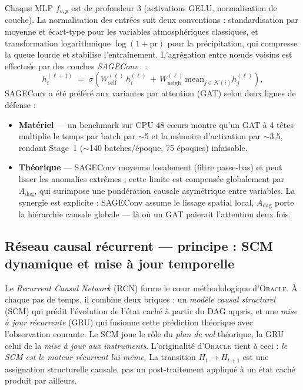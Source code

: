 \documentclass[14pt,a4paper,openany]{extreport}
\theoremstyle{definition}
\newcommand{\Oracle}{\textsc{Oracle}}
\newcommand{\Adag}{\ensuremath{A_{\mathrm{dag}}}}
\newcommand{\Ht}{\ensuremath{H_t}}
\begin{document}
Chaque MLP $f_{v,p}$ est de profondeur 3 (activations GELU, normalisation de couche). La normalisation des entrées suit deux conventions : standardisation par moyenne et écart-type pour les variables atmosphériques classiques, et transformation logarithmique $\log(1 + \mathrm{pr})$ pour la précipitation, qui compresse la queue lourde et stabilise l'entraînement. L'agrégation entre nœuds voisins est effectuée par des couches \emph{SAGEConv}~\cite{hamilton_sage_2017} :
\begin{equation}
  h_i^{(\ell+1)} \;=\; \sigma\!\left( W_{\mathrm{self}}^{(\ell)}\, h_i^{(\ell)} \,+\, W_{\mathrm{neigh}}^{(\ell)}\, \mathrm{mean}_{j \in \mathcal{N}(i)} h_j^{(\ell)} \right),
  \label{eq:sageconv}
\end{equation}
SAGEConv a été préféré aux variantes par attention (GAT) selon deux lignes de défense :
\begin{itemize}[leftmargin=1.2em, itemsep=2pt]
    \item \textbf{Matériel} --- un benchmark sur CPU 48 cœurs montre qu'un GAT à 4 têtes multiplie le temps par batch par $\sim$5 et la mémoire d'activation par $\sim$3,5, rendant Stage~1 ($\sim$140 batches/époque, 75 époques) infaisable.
    \item \textbf{Théorique} --- SAGEConv moyenne localement (filtre passe-bas) et peut lisser les anomalies extrêmes ; cette limite est compensée globalement par $\Adag$, qui surimpose une pondération causale asymétrique entre variables. La synergie est explicite : SAGEConv assume le lissage spatial local, $\Adag$ porte la hiérarchie causale globale --- là où un GAT paierait l'attention deux fois.
\end{itemize}

\subsection{Réseau causal récurrent --- principe : SCM dynamique et mise à jour temporelle}
\label{sec:oracle-rcn}

Le \emph{Recurrent Causal Network} (RCN) forme le cœur méthodologique d'\Oracle{}. À chaque pas de temps, il combine deux briques : un \emph{modèle causal structurel} (SCM) qui prédit l'évolution de l'état caché à partir du DAG appris, et une \emph{mise à jour récurrente} (GRU) qui fusionne cette prédiction théorique avec l'observation courante. Le SCM joue le rôle du \emph{plan de vol} théorique, la GRU celui de la \emph{mise à jour aux instruments}. L'originalité d'\Oracle{} tient à ceci : \emph{le SCM est le moteur récurrent lui-même}. La transition $\Ht \to H_{t+1}$ est une assignation structurelle causale, pas un post-traitement appliqué à un état caché produit par ailleurs.
\end{document}
